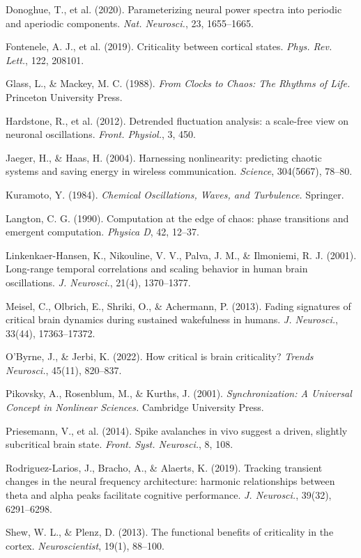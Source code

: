 \documentclass[11pt]{article}
\begin{document}
\begin{list}{}{\setlength{\itemsep}{1pt}\setlength{\leftmargin}{1.2em}\setlength{\itemindent}{-1.2em}}
\item Donoghue, T., et al. (2020). Parameterizing neural power spectra into periodic and aperiodic components. \emph{Nat. Neurosci.}, 23, 1655–1665.
\item Fontenele, A. J., et al. (2019). Criticality between cortical states. \emph{Phys. Rev. Lett.}, 122, 208101.
\item Glass, L., \& Mackey, M. C. (1988). \emph{From Clocks to Chaos: The Rhythms of Life.} Princeton University Press.
\item Hardstone, R., et al. (2012). Detrended fluctuation analysis: a scale-free view on neuronal oscillations. \emph{Front. Physiol.}, 3, 450.
\item Jaeger, H., \& Haas, H. (2004). Harnessing nonlinearity: predicting chaotic systems and saving energy in wireless communication. \emph{Science}, 304(5667), 78–80.
\item Kuramoto, Y. (1984). \emph{Chemical Oscillations, Waves, and Turbulence.} Springer.
\item Langton, C. G. (1990). Computation at the edge of chaos: phase transitions and emergent computation. \emph{Physica D}, 42, 12–37.
\item Linkenkaer-Hansen, K., Nikouline, V. V., Palva, J. M., \& Ilmoniemi, R. J. (2001). Long-range temporal correlations and scaling behavior in human brain oscillations. \emph{J. Neurosci.}, 21(4), 1370–1377.
\item Meisel, C., Olbrich, E., Shriki, O., \& Achermann, P. (2013). Fading signatures of critical brain dynamics during sustained wakefulness in humans. \emph{J. Neurosci.}, 33(44), 17363–17372.
\item O'Byrne, J., \& Jerbi, K. (2022). How critical is brain criticality? \emph{Trends Neurosci.}, 45(11), 820–837.
\item Pikovsky, A., Rosenblum, M., \& Kurths, J. (2001). \emph{Synchronization: A Universal Concept in Nonlinear Sciences.} Cambridge University Press.
\item Priesemann, V., et al. (2014). Spike avalanches in vivo suggest a driven, slightly subcritical brain state. \emph{Front. Syst. Neurosci.}, 8, 108.
\item Rodriguez-Larios, J., Bracho, A., \& Alaerts, K. (2019). Tracking transient changes in the neural frequency architecture: harmonic relationships between theta and alpha peaks facilitate cognitive performance. \emph{J. Neurosci.}, 39(32), 6291–6298.
\item Shew, W. L., \& Plenz, D. (2013). The functional benefits of criticality in the cortex. \emph{Neuroscientist}, 19(1), 88–100.

\end{list}
\end{document}
